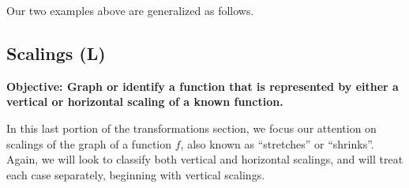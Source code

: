 \documentclass[12pt]{book}
\theoremstyle{definition}
\begin{document}
Our two examples above are generalized as follows.
\begin{center}
\end{center}
\subsection{Scalings (L)}
{\bf Objective: Graph or identify a function that is represented by either a vertical or horizontal scaling of a known function.}\par
In this last portion of the transformations section, we focus our attention on scalings of the graph of a function $f$, also known as ``stretches'' or ``shrinks''.  Again, we will look to classify both vertical and horizontal scalings, and will treat each case separately, beginning with vertical scalings.
\end{document}
